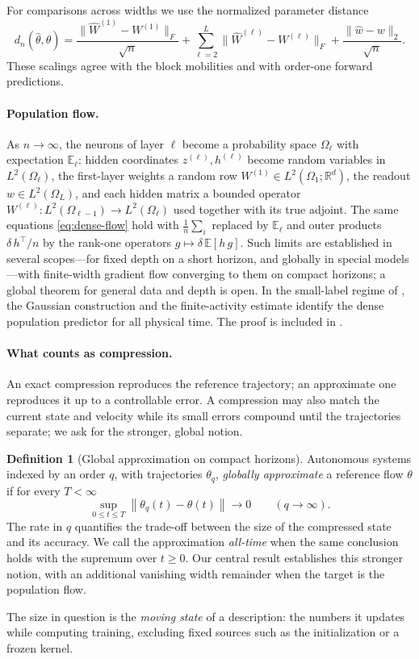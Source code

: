 \documentclass[11pt]{article}
\theoremstyle{definition}
\newtheorem{definition}[theorem]{Definition}
\theoremstyle{remark}
\newcommand{\R}{\mathbb{R}}
\newcommand{\E}{\mathbb{E}}
\newcommand{\norm}[1]{\left\lVert #1\right\rVert}
\begin{document}
For comparisons across widths we use the normalized parameter distance
\begin{equation}
 d_n(\widehat\theta,\theta)
 =\frac{\|\widehat W^{(1)}-W^{(1)}\|_F}{\sqrt n}
 +\sum_{\ell=2}^L\|\widehat W^{(\ell)}-W^{(\ell)}\|_F
 +\frac{\|\widehat w-w\|_2}{\sqrt n}.
 \label{eq:normalized-distance}
\end{equation}
These scalings agree with the block mobilities and with order-one
forward predictions.

\paragraph{Population flow.}
As $n\to\infty$, the neurons of layer $\ell$ become a probability space
$\Omega_\ell$ with expectation $\E_\ell$: hidden coordinates $z^{(\ell)},h^{(\ell)}$
become random variables in $L^2(\Omega_\ell)$, the first-layer weights a random
row $W^{(1)}\in L^2(\Omega_1;\R^d)$, the readout $w\in L^2(\Omega_L)$, and each
hidden matrix a bounded operator $W^{(\ell)}:L^2(\Omega_{\ell-1})\to L^2(\Omega_\ell)$
used together with its true adjoint.  The same equations \eqref{eq:dense-flow}
hold with $\frac1n\sum_i$ replaced by $\E_\ell$ and outer products
$\delta\,h^\top/n$ by the rank-one operators $g\mapsto\delta\,\E[h\,g]$.  Such
limits are established in several scopes---for fixed depth on a short horizon,
and globally in special models---with finite-width gradient flow converging to
them on compact horizons; a global theorem for general data and depth is open.
In the small-label regime of , the Gaussian construction
and the finite-activity estimate identify the dense population predictor
for all physical time.  The proof is included in .

\paragraph{What counts as compression.}
An exact compression reproduces the reference trajectory; an approximate one
reproduces it up to a controllable error.  A compression may also match the
current state and velocity while its small errors compound until the
trajectories separate; we ask for the stronger, global notion.

\begin{definition}[Global approximation on compact horizons]
\label{def:global}
Autonomous systems indexed by an order $q$, with trajectories $\theta_q$,
\emph{globally approximate} a reference flow $\theta$ if for every $T<\infty$
\[
  \sup_{0\le t\le T}\norm{\theta_q(t)-\theta(t)}\longrightarrow0
  \qquad(q\to\infty).
\]
The rate in $q$ quantifies the trade-off between the size of the compressed
state and its accuracy.  We call the approximation \emph{all-time} when the
same conclusion holds with the supremum over $t\ge0$.  Our central result
establishes this stronger notion, with an additional vanishing width
remainder when the target is the population flow.
\end{definition}
The size in question is the \emph{moving state} of a description: the numbers
it updates while computing training, excluding fixed sources such as the
initialization or a frozen kernel.
\end{document}
